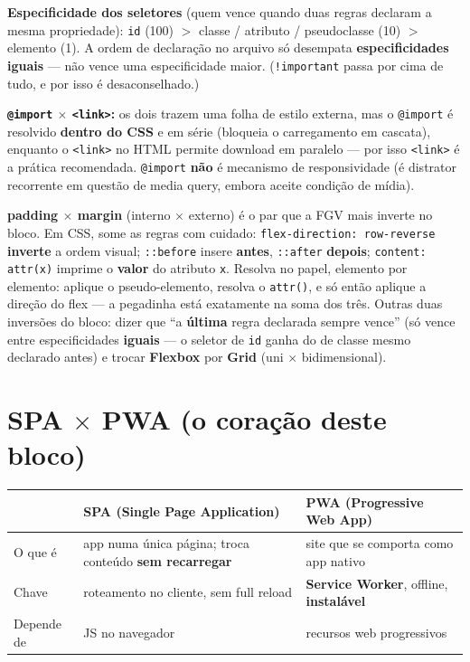 \textbf{Especificidade dos seletores} (quem vence quando duas regras
declaram a mesma propriedade): \texttt{id} (100) $>$ classe / atributo /
pseudoclasse (10) $>$ elemento (1). A ordem de declaração no arquivo só
desempata \textbf{especificidades iguais} --- não vence uma especificidade
maior. (\texttt{!important} passa por cima de tudo, e por isso é
desaconselhado.)

\textbf{\texttt{@import} $\times$ \texttt{<link>}:} os dois trazem uma folha
de estilo externa, mas o \texttt{@import} é resolvido \textbf{dentro do CSS}
e em série (bloqueia o carregamento em cascata), enquanto o \texttt{<link>}
no HTML permite download em paralelo --- por isso \texttt{<link>} é a prática
recomendada. \texttt{@import} \textbf{não} é mecanismo de responsividade (é
distrator recorrente em questão de media query, embora aceite condição de
mídia).

\begin{pegadinha}
\textbf{padding $\times$ margin} (interno $\times$ externo) é o par que a
FGV mais inverte no bloco. Em CSS, some as regras com cuidado:
\texttt{flex-direction: row-reverse} \textbf{inverte} a ordem visual;
\texttt{::before} insere \textbf{antes}, \texttt{::after} \textbf{depois};
\texttt{content: attr(x)} imprime o \textbf{valor} do atributo \texttt{x}.
Resolva no papel, elemento por elemento: aplique o pseudo-elemento, resolva o
\texttt{attr()}, e só então aplique a direção do flex --- a pegadinha está
exatamente na soma dos três. Outras duas inversões do bloco: dizer que
``a \textbf{última} regra declarada sempre vence'' (só vence entre
especificidades \textbf{iguais} --- o seletor de \texttt{id} ganha do de
classe mesmo declarado antes) e trocar \textbf{Flexbox} por \textbf{Grid}
(uni $\times$ bidimensional).
\end{pegadinha}

\section{SPA $\times$ PWA (o coração deste bloco)}

\begin{center}
\begin{tabular}{@{}p{2.6cm}p{4.6cm}p{4.6cm}@{}}
\toprule
& \textbf{SPA (Single Page Application)} & \textbf{PWA (Progressive Web App)} \\
\midrule
O que é & app numa única página; troca conteúdo \textbf{sem recarregar} & site que se comporta como app nativo \\
Chave & roteamento no cliente, sem full reload & \textbf{Service Worker}, offline, \textbf{instalável} \\
Depende de & JS no navegador & recursos web progressivos \\
\bottomrule
\end{tabular}
\end{center}

